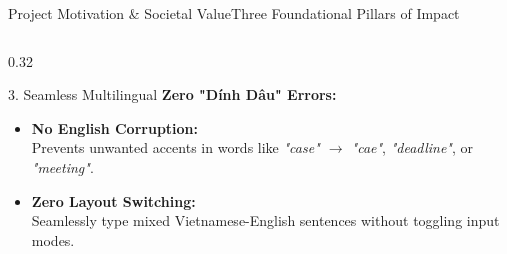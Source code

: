 \documentclass[aspectratio=169,10pt]{beamer}
\begin{document}
\begin{frame}{Project Motivation \& Societal Value}{Three Foundational Pillars of Impact}
\begin{columns}[T]
    \begin{column}{0.32\textwidth}
      \begin{block}{3. Seamless Multilingual}
        \textbf{\footnotesize Zero "D\'inh D\^au" Errors:}
        \begin{itemize}\setlength{\itemsep}{2.5pt}\scriptsize
          \item \textbf{No English Corruption:}\\
            Prevents unwanted accents in words like \textit{"case" $\to$ "cae"}, \textit{"deadline"}, or \textit{"meeting"}.
          \item \textbf{Zero Layout Switching:}\\
            Seamlessly type mixed Vietnamese-English sentences without toggling input modes.
        \end{itemize}
      \end{block}
    \end{column}
  \end{columns}
\end{frame}
\end{document}
